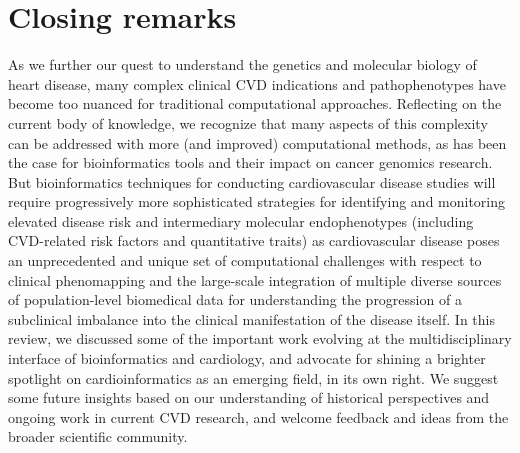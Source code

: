 \documentclass[letter]{bib}
\begin{document}
	\section*{Closing remarks}
	As we further our quest to understand the genetics and molecular biology of heart disease, many complex clinical CVD indications and pathophenotypes have become too nuanced for traditional computational approaches. Reflecting on the current body of knowledge, we recognize that many aspects of this complexity can be addressed with more (and improved) computational methods, as has been the case for bioinformatics tools and their impact on cancer genomics research.  But bioinformatics techniques for conducting cardiovascular disease studies will require progressively more sophisticated strategies for identifying and monitoring elevated disease risk and intermediary molecular endophenotypes (including CVD-related risk factors and quantitative traits) as cardiovascular disease poses an unprecedented and unique set of computational challenges with respect to clinical phenomapping and the large-scale integration of multiple diverse sources of population-level biomedical data for understanding the progression of a subclinical imbalance into the clinical manifestation of the disease itself.  In this review, we discussed some of the important work evolving at the multidisciplinary interface of bioinformatics and cardiology, and advocate for shining a brighter spotlight on cardioinformatics as an emerging field, in its own right.  We suggest some future insights based on our understanding of historical perspectives and ongoing work in current CVD research, and welcome feedback and ideas from the broader scientific community.
\end{document}
